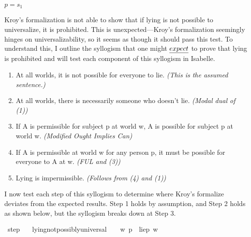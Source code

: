 \begin{isabellebody}
{    $p = s_1$ \color{black}%
}%
\endisatagproof
{\isafoldproof}%
%
\isadelimproof
%
\endisadelimproof
%
\begin{isamarkuptext}%
Kroy's formalization is not able to show that if lying is not possible 
      to universalize, it is prohibited. This is unexpected—Kroy's formalization seemingly hinges
on universalizability, so it seems as though it should pass this test. To understand this, I 
  outline the syllogism that one might $\emph{expect}$ to prove that lying is prohibited and will 
test each component of this syllogism in Isabelle.%
\end{isamarkuptext}\isamarkuptrue%
%
\begin{isamarkuptext}%
\begin{enumerate}
        \item At all worlds, it is not possible for everyone to lie. \emph{(This is the assumed sentence.)}
        \item At all worlds, there is necessarily someone who doesn't lie. \emph{(Modal dual of (1))}
        \item If A is permissible for subject p at world w, A is possible for subject p at world w. \emph{(Modified Ought Implies Can)}
        \item If A is permissible at world w for any person p, it must be possible for everyone to A at w. \emph{(FUL and (3))}
        \item Lying is impermissible. \emph{(Follows from (4) and (1))} \end{enumerate}%
\end{isamarkuptext}\isamarkuptrue%
%
\begin{isamarkuptext}%
I now test each step of this syllogism to determine where Kroy's formalize deviates from the
expected results. Step 1 holds by assumption, and Step 2 holds as shown below, but the syllogism breaks down
at Step 3.%
\end{isamarkuptext}\isamarkuptrue%
\isamarkupfalse%
\ step{}{\isacharcolon}\isanewline
\ \ \ {\isachardoublequoteopen}lying{\isacharunderscore}not{\isacharunderscore}possibly{\isacharunderscore}universal\ {\isasymlongrightarrow}\ {\isasymTurnstile}{\isacharparenleft}\ {\isacharparenleft}{\isasymbox}\ {\isacharparenleft}{\isasymlambda}w{\isachardot}\ {\isasymexists}p{\isachardot}\ {\isacharparenleft}\isactrlbold {\isasymnot}\ {\isacharparenleft}lie{\isacharparenleft}p{\isacharparenright}{\isacharparenright}\ w{\isacharparenright}{\isacharparenright}{\isacharparenright}{\isacharparenright}\ {\isachardoublequoteclose}\isanewline

\end{isabellebody}
